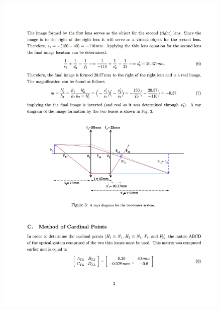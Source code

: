 \begin{figure}[h]
	
	\centering
	\includegraphics[width=1.0\linewidth]{__Images/09/Glytsis2014_3.png}
\end{figure}

